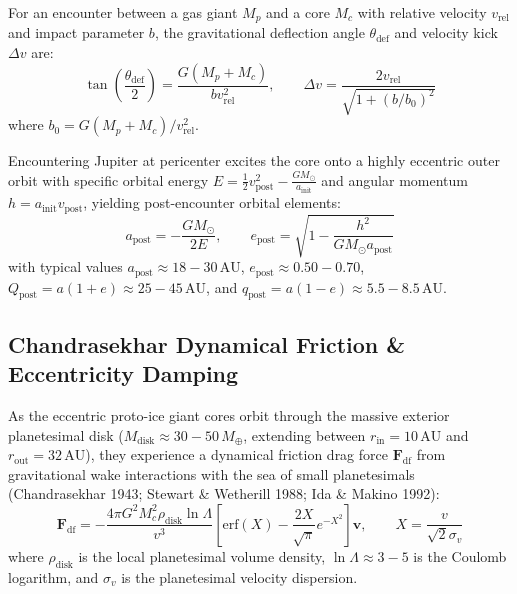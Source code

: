 \documentclass[11pt,a4paper]{article}
\begin{document}
For an encounter between a gas giant $M_p$ and a core $M_c$ with relative velocity $v_{\text{rel}}$ and impact parameter $b$, the gravitational deflection angle $\theta_{\text{def}}$ and velocity kick $\Delta v$ are:
\begin{equation}
\tan\left(\frac{\theta_{\text{def}}}{2}\right) = \frac{G(M_p + M_c)}{b v_{\text{rel}}^2}, \qquad \Delta v = \frac{2 v_{\text{rel}}}{\sqrt{1 + (b / b_0)^2}}
\label{eq:encounter_kick}
\end{equation}
where $b_0 = G(M_p + M_c) / v_{\text{rel}}^2$.

Encountering Jupiter at pericenter excites the core onto a highly eccentric outer orbit with specific orbital energy $E = \frac{1}{2} v_{\text{post}}^2 - \frac{G M_\odot}{a_{\text{init}}}$ and angular momentum $h = a_{\text{init}} v_{\text{post}}$, yielding post-encounter orbital elements:
\begin{equation}
a_{\text{post}} = -\frac{G M_\odot}{2 E}, \qquad e_{\text{post}} = \sqrt{1 - \frac{h^2}{G M_\odot a_{\text{post}}}}
\label{eq:post_elements}
\end{equation}
with typical values $a_{\text{post}} \approx 18-30\,\text{AU}$, $e_{\text{post}} \approx 0.50-0.70$, $Q_{\text{post}} = a(1+e) \approx 25-45\,\text{AU}$, and $q_{\text{post}} = a(1-e) \approx 5.5-8.5\,\text{AU}$.

\subsection{Chandrasekhar Dynamical Friction \& Eccentricity Damping}
As the eccentric proto-ice giant cores orbit through the massive exterior planetesimal disk ($M_{\text{disk}} \approx 30-50\,M_\oplus$, extending between $r_{\text{in}} = 10\,\text{AU}$ and $r_{\text{out}} = 32\,\text{AU}$), they experience a dynamical friction drag force $\mathbf{F}_{\text{df}}$ from gravitational wake interactions with the sea of small planetesimals (Chandrasekhar 1943; Stewart \& Wetherill 1988; Ida \& Makino 1992):
\begin{equation}
\mathbf{F}_{\text{df}} = -\frac{4\pi G^2 M_c^2 \rho_{\text{disk}} \ln\Lambda}{v^3} \left[ \text{erf}(X) - \frac{2 X}{\sqrt{\pi}} e^{-X^2} \right] \mathbf{v}, \qquad X = \frac{v}{\sqrt{2}\sigma_v}
\label{eq:chandrasekhar}
\end{equation}
where $\rho_{\text{disk}}$ is the local planetesimal volume density, $\ln\Lambda \approx 3-5$ is the Coulomb logarithm, and $\sigma_v$ is the planetesimal velocity dispersion.
\end{document}
